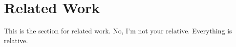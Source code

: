 \chapter{Related Work}
This is the section for related work. 
No, I'm not your relative. 
Everything is relative.